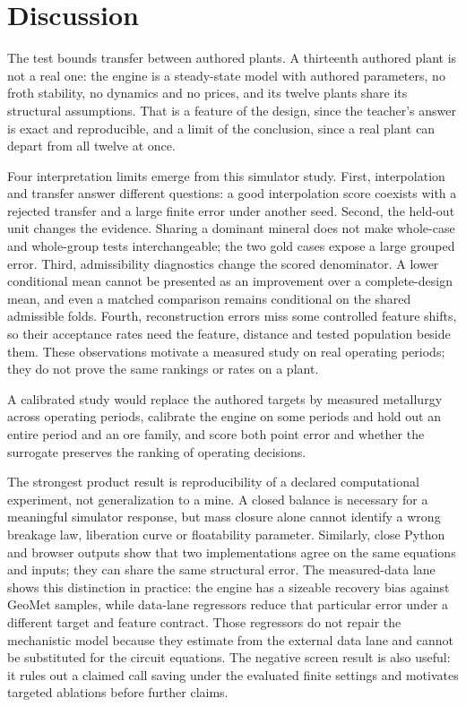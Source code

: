 \documentclass[10pt]{article}
\begin{document}


\section{Discussion}\label{discussion}

The test bounds transfer between authored plants. A thirteenth authored
plant is not a real one: the engine is a steady-state model with
authored parameters, no froth stability, no dynamics and no prices, and
its twelve plants share its structural assumptions. That is a feature of
the design, since the teacher's answer is exact and reproducible, and a
limit of the conclusion, since a real plant can depart from all twelve
at once.

Four interpretation limits emerge from this simulator study. First,
interpolation and transfer answer different questions: a good
interpolation score coexists with a rejected transfer and a large finite
error under another seed. Second, the held-out unit changes the
evidence. Sharing a dominant mineral does not make whole-case and
whole-group tests interchangeable; the two gold cases expose a large
grouped error. Third, admissibility diagnostics change the scored
denominator. A lower conditional mean cannot be presented as an
improvement over a complete-design mean, and even a matched comparison
remains conditional on the shared admissible folds. Fourth,
reconstruction errors miss some controlled feature shifts, so their
acceptance rates need the feature, distance and tested population beside
them. These observations motivate a measured study on real operating
periods; they do not prove the same rankings or rates on a plant.

A calibrated study would replace the authored targets by measured
metallurgy across operating periods, calibrate the engine on some
periods and hold out an entire period and an ore family, and score both
point error and whether the surrogate preserves the ranking of operating
decisions.

The strongest product result is reproducibility of a declared
computational experiment, not generalization to a mine. A closed balance
is necessary for a meaningful simulator response, but mass closure alone
cannot identify a wrong breakage law, liberation curve or floatability
parameter. Similarly, close Python and browser outputs show that two
implementations agree on the same equations and inputs; they can share
the same structural error. The measured-data lane shows this distinction
in practice: the engine has a sizeable recovery bias against GeoMet
samples, while data-lane regressors reduce that particular error under a
different target and feature contract. Those regressors do not repair
the mechanistic model because they estimate from the external data lane
and cannot be substituted for the circuit equations. The negative screen
result is also useful: it rules out a claimed call saving under the
evaluated finite settings and motivates targeted ablations before
further claims.
\end{document}
